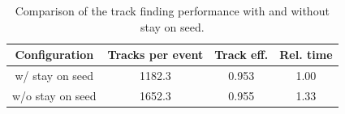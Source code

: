 %

\begin{table}[ht]
    \centering
    \begin{tabular}{cccc}
        \hline
        \textbf{Configuration} & \textbf{Tracks per event} & \textbf{Track eff.} & \textbf{Rel. time} \\
        \hline
        w/ stay on seed  & 1182.3 & 0.953 & 1.00 \\
        w/o stay on seed & 1652.3 & 0.955 & 1.33 \\
        \hline
    \end{tabular}
    \caption{Comparison of the track finding performance with and without stay on seed.}
    \label{tab:dev/trackfinding/stay-on-seed}
\end{table}
